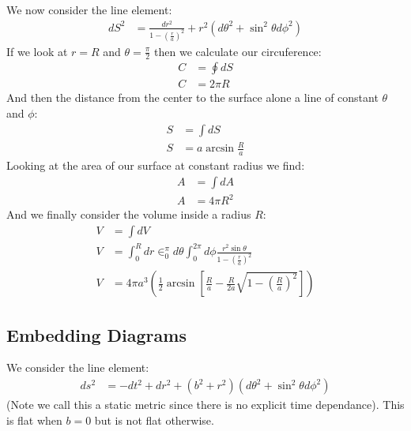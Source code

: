We now consider the line element:
\begin{align*}
	dS^2 &= \frac{dr^2}{1-\left(\frac{r}{a}\right)^2} + r^2(d\theta^2 + \sin^2\theta d\phi^2)
\end{align*}
If we look at $r=R$ and $\theta = \frac{\pi}{2}$ then we calculate our circuference:
\begin{align*}
	C &= \oint dS \\
	C &= 2\pi R
\end{align*}
And then the distance from the center to the surface alone a line of constant $\theta$ and $\phi$:
\begin{align*}
	S &= \int dS \\
	S &= a\arcsin \frac{R}{a}
\end{align*}
Looking at the area of our surface at constant radius we find:
\begin{align*}
	A &= \int dA \\
	A &= 4\pi R^2
\end{align*}
And we finally consider the volume inside a radius $R$:
\begin{align*}
	V &= \int dV \\
	V &= \int_0^R dr\in_0^\pi d\theta\int_0^{2\pi}d\phi \frac{r^2\sin\theta}{1-\left(\frac{r}{a}\right)^2} \\
	V &= 4\pi a^3 \left(\frac{1}{2}\arcsin\left[\frac{R}{a}  - \frac{R}{2a} \sqrt{1 - \left(\frac{R}{a}\right)^2}\right]\right)
\end{align*}

\subsection{Embedding Diagrams}
We consider the line element:
\begin{align*}
	ds^2 &= -dt^2 + dr^2 +(b^2 + r^2)(d\theta^2 + \sin^2\theta d\phi^2)
\end{align*}
(Note we call this a static metric since there is no explicit time dependance). This is flat when $b=0$ but is not flat otherwise.


